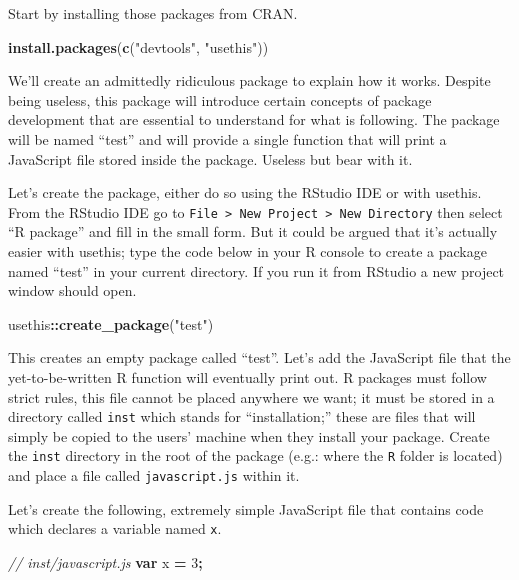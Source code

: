 \documentclass[
]{krantz}
\makeatletter
\newenvironment{Shaded}{\begin{snugshade}}{\end{snugshade}}
\newcommand{\CommentTok}[1]{\textcolor[rgb]{0.37,0.37,0.37}{\textit{#1}}}
\newcommand{\DecValTok}[1]{\textcolor[rgb]{0.06,0.06,0.06}{#1}}
\newcommand{\KeywordTok}[1]{\textcolor[rgb]{0.27,0.27,0.27}{\textbf{#1}}}
\newcommand{\NormalTok}[1]{#1}
\newcommand{\OperatorTok}[1]{\textcolor[rgb]{0.43,0.43,0.43}{\textbf{#1}}}
\newcommand{\StringTok}[1]{\textcolor[rgb]{0.5,0.5,0.5}{#1}}
\newenvironment{kframe}{%
\medskip{}
\setlength{\fboxsep}{.8em}
 \def\at@end@of@kframe{}%
 \ifinner\ifhmode%
  \def\at@end@of@kframe{\end{minipage}}%
  \begin{minipage}{\columnwidth}%
 \fi\fi%
 \def\FrameCommand##1{\hskip\@totalleftmargin \hskip-\fboxsep
 \colorbox{shadecolor}{##1}\hskip-\fboxsep
     \hskip-\linewidth \hskip-\@totalleftmargin \hskip\columnwidth}%
 \MakeFramed {\advance\hsize-\width
   \@totalleftmargin\z@ \linewidth\hsize
   \@setminipage}}%
 {\par\unskip\endMakeFramed%
 \at@end@of@kframe}
\renewenvironment{Shaded}{\begin{kframe}}{\end{kframe}}
\makeatother
\begin{document}
Start by installing those packages from CRAN.

\begin{Shaded}
\begin{Highlighting}[]
\KeywordTok{install.packages}\NormalTok{(}\KeywordTok{c}\NormalTok{(}\StringTok{"devtools"}\NormalTok{, }\StringTok{"usethis"}\NormalTok{))}
\end{Highlighting}
\end{Shaded}

We'll create an admittedly ridiculous package to explain how it works. Despite being useless, this package will introduce certain concepts of package development that are essential to understand for what is following. The package will be named ``test'' and will provide a single function that will print a JavaScript file stored inside the package. Useless but bear with it.

Let's create the package, either do so using the RStudio IDE or with usethis. From the RStudio IDE go to \texttt{File\ \textgreater{}\ New\ Project\ \textgreater{}\ New\ Directory} then select ``R package'' and fill in the small form. But it could be argued that it's actually easier with usethis; type the code below in your R console to create a package named ``test'' in your current directory. If you run it from RStudio a new project window should open.

\begin{Shaded}
\begin{Highlighting}[]
\NormalTok{usethis}\OperatorTok{::}\KeywordTok{create\_package}\NormalTok{(}\StringTok{"test"}\NormalTok{)}
\end{Highlighting}
\end{Shaded}

This creates an empty package called ``test''. Let's add the JavaScript file that the yet-to-be-written R function will eventually print out. R packages must follow strict rules, this file cannot be placed anywhere we want; it must be stored in a directory called \texttt{inst} which stands for ``installation;'' these are files that will simply be copied to the users' machine when they install your package. Create the \texttt{inst} directory in the root of the package (e.g.: where the \texttt{R} folder is located) and place a file called \texttt{javascript.js} within it.

Let's create the following, extremely simple JavaScript file that contains code which declares a variable named \texttt{x}.

\begin{Shaded}
\begin{Highlighting}[]
\CommentTok{// inst/javascript.js}
\KeywordTok{var}\NormalTok{ x }\OperatorTok{=} \DecValTok{3}\OperatorTok{;}
\end{Highlighting}
\end{Shaded}
\end{document}
